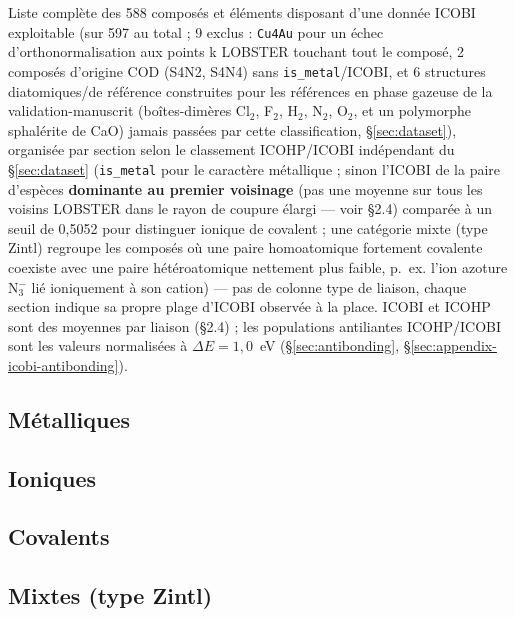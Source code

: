 \documentclass[11pt,a4paper]{article}
\begin{document}
Liste complète des 588 composés et éléments disposant d'une donnée ICOBI
exploitable (sur 597 au total ; 9 exclus : \texttt{Cu4Au} pour un échec
d'orthonormalisation aux points k LOBSTER touchant tout le composé, 2
composés d'origine COD (S4N2, S4N4) sans \texttt{is\_metal}/ICOBI, et 6
structures diatomiques/de référence construites pour les références en
phase gazeuse de la validation-manuscrit (boîtes-dimères Cl$_2$, F$_2$,
H$_2$, N$_2$, O$_2$, et un polymorphe sphalérite de CaO) jamais passées
par cette classification, \S\ref{sec:dataset}), organisée par section
selon le classement ICOHP/ICOBI indépendant du \S\ref{sec:dataset}
(\texttt{is\_metal} pour le caractère métallique ; sinon l'ICOBI de la
paire d'espèces \textbf{dominante au premier voisinage} (pas une
moyenne sur tous les voisins LOBSTER dans le rayon de coupure élargi
--- voir \S2.4) comparée à un seuil de 0,5052 pour distinguer ionique
de covalent ; une catégorie \og{}mixte\fg{} (type Zintl) regroupe les
composés où une paire homoatomique fortement covalente coexiste avec
une paire hétéroatomique nettement plus faible, p.~ex. l'ion azoture
N$_3^-$ lié ioniquement à son cation) --- pas de colonne \og{}type de
liaison\fg{}, chaque section indique sa propre plage d'ICOBI observée
à la place. ICOBI et ICOHP sont des
moyennes par liaison (\S2.4) ; les populations antiliantes ICOHP/ICOBI
sont les valeurs normalisées à $\Delta E=1{,}0$~eV
(\S\ref{sec:antibonding}, \S\ref{sec:appendix-icobi-antibonding}).

\subsection{Métalliques}

{\small

}

\subsection{Ioniques}

{\small

}

\subsection{Covalents}

{\small

}

\subsection{Mixtes (type Zintl)}
\end{document}
